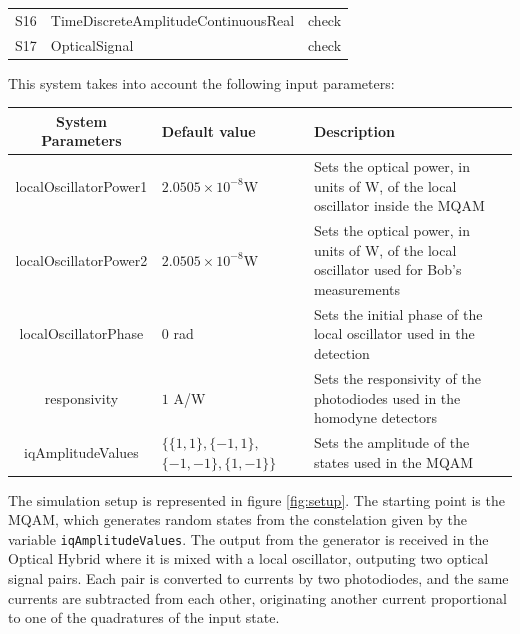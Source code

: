 \begin{bibunit}[plain]
\begin{table}[H]
\begin{tabular}{|c|l|l|}
S16					& TimeDiscreteAmplitudeContinuousReal	& check\\
S17					& OpticalSignal							& check\\
\hline
\end{tabular}
\end{table}
%
\vspace{2em}
%
This system takes into account the following input parameters:
\begin{table}[H]
\centering
\begin{tabulary}{1.0\textwidth}{|c|p{30mm}|p{70mm}|}
\hline
\textbf{System Parameters}	& {\bf Default value}		& \textbf{Description}\\
\hline
localOscillatorPower1		& $2.0505 \times 10^{-8}$W	& Sets the optical power, in units of W, of the local oscillator inside the MQAM\\
\hline
localOscillatorPower2		& $2.0505 \times 10^{-8}$W	& Sets the optical power, in units of W, of the local oscillator used for Bob's measurements\\
\hline
localOscillatorPhase		& $0$ rad					& Sets the initial phase of the local oscillator used in the detection\\
\hline
responsivity				& $1$ A/W					& Sets the responsivity of the photodiodes used in the homodyne detectors\\
\hline
iqAmplitudeValues			& $\{ \{ 1, 1 \}, \{ -1, 1 \},$ $ \{ -1, -1 \}, \{ 1, -1 \} \}$
														& Sets the amplitude of the states used in the MQAM\\
%
%
\hline
\end{tabulary}
\end{table}
%
\vspace{2em}
%
The simulation setup is represented in figure \ref{fig:setup}. The starting point is the MQAM, which generates random states from the constelation given by the variable \texttt{iqAmplitudeValues}. The output from the generator is received in the Optical Hybrid where it is mixed with a local oscillator, outputing two optical signal pairs. Each pair is converted to currents by two photodiodes, and the same currents are subtracted from each other, originating another current proportional to one of the quadratures of the input state.

\end{bibunit}
